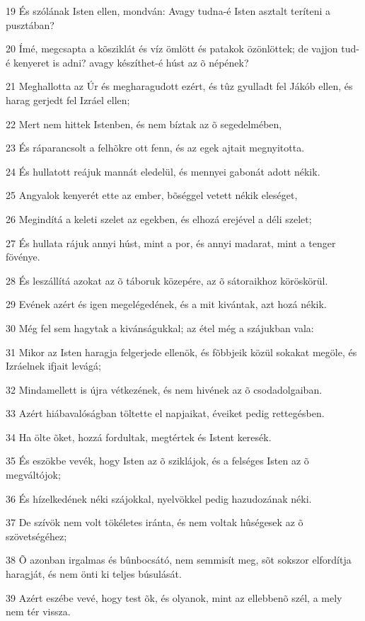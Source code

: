 \par 19 És szólának Isten ellen, mondván: Avagy tudna-é Isten asztalt teríteni a pusztában?
\par 20 Ímé, megcsapta a kõsziklát és víz ömlött és patakok özönlöttek; de vajjon tud-é kenyeret is adni? avagy készíthet-é húst az õ népének?
\par 21 Meghallotta az Úr és megharagudott ezért, és tûz gyulladt fel Jákób ellen, és harag gerjedt fel Izráel ellen;
\par 22 Mert nem hittek Istenben, és nem bíztak az õ segedelmében,
\par 23 És ráparancsolt a felhõkre ott fenn, és az egek ajtait megnyitotta.
\par 24 És hullatott reájuk mannát eledelül, és mennyei gabonát adott nékik.
\par 25 Angyalok kenyerét ette az ember, bõséggel vetett nékik eleséget,
\par 26 Megindítá a keleti szelet az egekben, és elhozá erejével a déli szelet;
\par 27 És hullata rájuk annyi húst, mint a por, és annyi madarat, mint a tenger fövénye.
\par 28 És leszállítá azokat az õ táboruk közepére, az õ sátoraikhoz köröskörül.
\par 29 Evének azért és igen megelégedének, és a mit kivántak, azt hozá nékik.
\par 30 Még fel sem hagytak a kivánságukkal; az étel még a szájukban vala:
\par 31 Mikor az Isten haragja felgerjede ellenök, és fõbbjeik közül sokakat megöle, és Izráelnek ifjait levágá;
\par 32 Mindamellett is újra vétkezének, és nem hivének az õ csodadolgaiban.
\par 33 Azért hiábavalóságban töltette el napjaikat, éveiket pedig rettegésben.
\par 34 Ha ölte õket, hozzá fordultak, megtértek és Istent keresék.
\par 35 És eszökbe vevék, hogy Isten az õ sziklájok, és a felséges Isten az õ megváltójok;
\par 36 És hízelkedének néki szájokkal, nyelvökkel pedig hazudozának néki.
\par 37 De szívök nem volt tökéletes iránta, és nem voltak hûségesek az õ szövetségéhez;
\par 38 Õ azonban irgalmas és bûnbocsátó, nem semmisít meg, sõt sokszor elfordítja haragját, és nem önti ki teljes búsulását.
\par 39 Azért eszébe vevé, hogy test õk, és olyanok, mint az ellebbenõ szél, a mely nem tér vissza.
